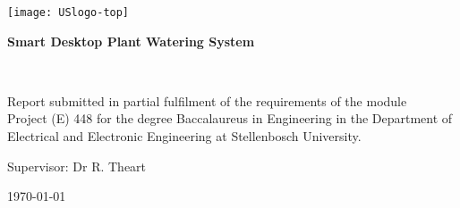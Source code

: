 \graphicspath{{frontmatter/fig/}}

\begin{titlepage}
\begin{center}

\texttt{[image: USlogo-top]}

\vfill

{\sffamily \bfseries \huge Smart Desktop Plant Watering System \par}

\vfill

{\large {\Large \name} \\ \studentnumber \par}

\vfill

\vfill

{Report submitted in partial fulfilment of the requirements of the module \\
Project (E) 448 for the degree Baccalaureus in Engineering in the Department of
Electrical and Electronic Engineering at Stellenbosch University. \par}

\vfill

{\large {Supervisor}: Dr R. Theart} %

\vfill

{\Large \today}
\end{center}
\end{titlepage}
